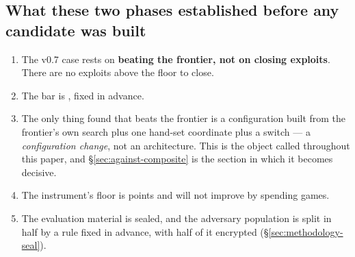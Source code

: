 \subsection{What these two phases established before any candidate was built}
\label{sec:instrument-established}

\begin{enumerate}
\item The v0.7 case rests on \textbf{beating the frontier, not on closing exploits}. There are no
      exploits above the floor to close.
\item The bar is \fcheap{}, fixed in advance.
\item The only thing found that beats the frontier is a configuration built from the frontier's own
      search plus one hand-set coordinate plus a switch --- a \emph{configuration change}, not an
      architecture. This is the object called \composite{} throughout this paper, and
      \S\ref{sec:against-composite} is the section in which it becomes decisive.
\item The instrument's floor is \vsevenPrimaryFloor{} points and will not improve by spending games.
\item The evaluation material is sealed, and the adversary population is split in half by a rule
      fixed in advance, with half of it encrypted (\S\ref{sec:methodology-seal}).
\end{enumerate}

